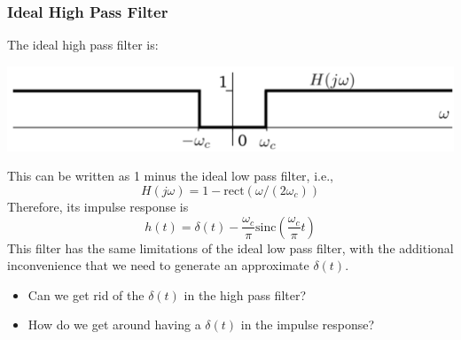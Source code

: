 \documentclass[10pt]{article}
\newcommand{\sinc}{\text{sinc}}
\newcommand{\rect}{\text{rect}}
\begin{document}
\subsubsection*{Ideal High Pass Filter}
The ideal high pass filter is:
\begin{center}
    \includegraphics[width=\textwidth]{W7_7.png}
\end{center}
This can be written as 1 minus the ideal low pass filter, i.e.,
\[H(j\omega) = 1 - \rect(\omega / (2\omega_c))\]
Therefore, its impulse response is
\[h(t) = \delta(t) - \frac{\omega_c}{\pi} \sinc\left(\frac{\omega_c}{\pi}t\right)\]
This filter has the same limitations of the ideal low pass filter, with the additional inconvenience that we need to generate an approximate $\delta(t)$.
\begin{itemize}
    \item Can we get rid of the $\delta(t)$ in the high pass filter?
    \item How do we get around having a $\delta(t)$ in the impulse response?
\end{itemize}
\end{document}
